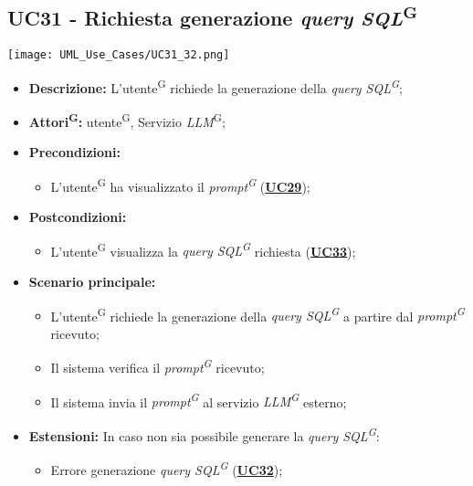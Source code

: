 \subsection{UC31 - Richiesta generazione \textit{query SQL}\textsuperscript{G}}
\label{sec:UC31}
\texttt{[image: UML\_Use\_Cases/UC31\_32.png]}
\begin{itemize}
    \item \textbf{Descrizione:} L'utente\textsuperscript{G} richiede la generazione della \textit{query SQL\textsuperscript{G}};
    \item \textbf{Attori\textsuperscript{G}:} utente\textsuperscript{G}, Servizio \textit{LLM}\textsuperscript{G};
    \item \textbf{Precondizioni:} 
    \begin{itemize}
    	\item L'utente\textsuperscript{G} ha visualizzato il \textit{prompt\textsuperscript{G}} (\hyperref[sec:UC29]{\textbf{UC29}});
    \end{itemize}
    \item \textbf{Postcondizioni:} 
    \begin{itemize}
    	\item L'utente\textsuperscript{G} visualizza la \textit{query SQL\textsuperscript{G}} richiesta (\hyperref[sec:UC33]{\textbf{UC33}});
    \end{itemize}
    \item \textbf{Scenario principale:}
    \begin{itemize}
    	\item L'utente\textsuperscript{G} richiede la generazione della \textit{query SQL\textsuperscript{G}} a partire dal \textit{prompt\textsuperscript{G}} ricevuto;
    	\item Il sistema verifica il \textit{prompt\textsuperscript{G}} ricevuto;
    	\item Il sistema invia il \textit{prompt\textsuperscript{G}} al servizio \textit{LLM\textsuperscript{G}} esterno;
    \end{itemize}
    \item \textbf{Estensioni:} In caso non sia possibile generare la \textit{query SQL\textsuperscript{G}}:
    \begin{itemize}
    	\item Errore generazione \textit{query SQL\textsuperscript{G}} (\hyperref[sec:UC32]{\textbf{UC32}});
    \end{itemize}
\end{itemize}

